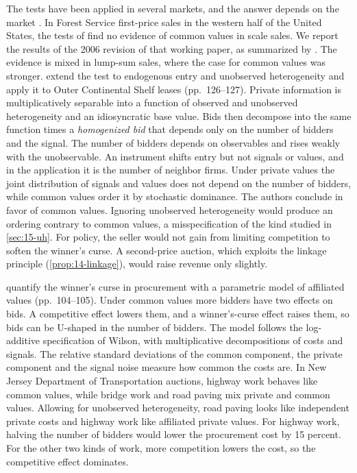  The tests have been applied in several
markets, and the answer depends on the market \citep[Sections~2.3, 3.2 and 4.1]{HortacsuPerrigne2021}. In
Forest Service first-price sales in the western half of the United States, the tests of
\citet{HaileHongShum2003} find no evidence of common values in scale sales. We report the results of the
2006 revision of that working paper, as summarized by \citet[pp.~93--94]{HortacsuPerrigne2021}. The evidence is
mixed in lump-sum sales, where the case for common values was stronger.
\citet{CompianiHaileSantAnna2020} extend the test to endogenous entry and unobserved heterogeneity and apply
it to Outer Continental Shelf leases (pp.~126--127). Private information is multiplicatively separable into a
function of observed and unobserved heterogeneity and an idiosyncratic base value. Bids then decompose into
the same function times a \emph{homogenized bid} that depends only on the number of bidders and the signal.
The number of bidders depends on observables and rises weakly with the unobservable. An instrument shifts
entry but not signals or values, and in the application it is the number of neighbor firms. Under private
values the joint distribution of signals and values does not depend on the number of bidders, while common
values order it by stochastic dominance. The authors conclude in favor of common values. Ignoring unobserved
heterogeneity would produce an ordering contrary to common values, a misspecification of the kind studied in
\cref{sec:15-uh}. For policy, the seller would not gain from limiting competition to soften the winner's
curse. A second-price auction, which exploits the linkage principle (\cref{prop:14-linkage}), would raise
revenue only slightly.

\citet{HongShum2002} quantify the winner's curse in procurement with a parametric model of affiliated values
(pp.~104--105). Under common values more bidders have two effects on bids. A competitive effect lowers them,
and a winner's-curse effect raises them, so bids can be U-shaped in the number of bidders. The model follows
the log-additive specification of Wilson, with multiplicative decompositions of costs and signals. The
relative standard deviations of the common component, the private component and the signal noise measure
how common the costs are. In New Jersey Department of Transportation auctions, highway work behaves like
common values, while bridge work and road paving mix private and common values. Allowing for unobserved
heterogeneity, road paving looks like independent private costs and highway work like affiliated private
values. For highway work, halving the number of bidders would lower the procurement cost by 15 percent. For
the other two kinds of work, more competition lowers the cost, so the competitive effect dominates.

